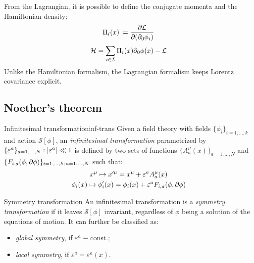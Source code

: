 From the Lagrangian, it is possible to define the conjugate momenta and the Hamiltonian density:
\begin{equation}
  \Pi_i(x) \defeq \frac{\pa \mathcal{L}}{\pa (\pa_0 \phi_i)}
  \label{eq:1.63}
\end{equation}
\begin{equation}
  \mathcal{H} = \sum_{i \in \mathcal{I}} \Pi_i(x) \partial_0 \phi(x) - \mathcal{L}
  \label{eq:1.64}
\end{equation}
Unlike the Hamiltonian formalism, the Lagrangian formalism keeps Lorentz covariance explicit.

\subsection{Noether's theorem}

\begin{definition}{Infinitesimal transformation}{inf-trans}
  Given a field theory with fields $ \{\phi_i\}_{i = 1, \dots, k} $ and action $ \mathcal{S}[\phi] $, an \textit{infinitesimal transformation} parametrized by $ \{\varepsilon^a\}_{a = 1, \dots, N} : \left\lvert\varepsilon^a\right\rvert \ll 1 $ is defined by two sets of functions $ \{A^\mu_a(x)\}_{a = 1, \dots, N} $ and $ \{F_{i,a}(\phi,\partial \phi)\}_{i = 1, \dots, k ;\, a = 1, \dots, N} $ such that:
  \begin{equation}
    \begin{gathered}
      x^\mu \mapsto x'^\mu = x^\mu + \varepsilon^a A^\mu_a(x) \\
      \phi_i(x) \mapsto \phi'_i(x) = \phi_i(x) + \varepsilon^a F_{i,a}(\phi, \partial \phi)
    \end{gathered}
    \label{eq:1.65}
  \end{equation}
\end{definition}

\begin{definition}{Symmetry transformation}{}
  An infinitesimal transformation is a \textit{symmetry transformation} if it leaves $ \mathcal{S}[\phi] $ invariant, regardless of $ \phi $ being a solution of the equations of motion. It can further be classified as:
  \begin{itemize}
    \item \textit{global symmetry}, if $ \varepsilon^a \equiv \mathrm{const.} $;
    \item \textit{local symmetry}, if $ \varepsilon^a = \varepsilon^a(x) $.
  \end{itemize}
\end{definition}

